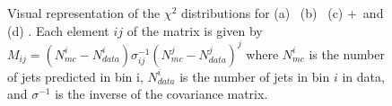 \begin{figure}
\centering
{} 
~
\\
~
~
\caption{Visual representation of the $\chi^2$ distributions for (a) \powpy\ (b) \peight\ (c)  \madgraph +\py\  and (d) \hdamp. Each element $ij$ of the matrix is given by $M_{ij}=(N^{i}_{mc}-N^{i}_{data})\sigma^{-1}_{ij}(N^{j}_{mc}-N^{j}_{data})^{j}$ where $N^{i}_{mc}$ is the number of jets predicted in bin i, $N^{i}_{data}$ is the number of jets in bin $i$ in data, and $\sigma^{-1}$ is the inverse of the covariance matrix.}
\label{fig:chi2}
\end{figure}

